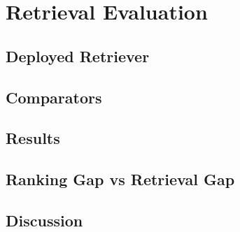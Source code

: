 \section{Retrieval Evaluation}
\label{sec:retrieval-results}


\subsection{Deployed Retriever}

\subsection{Comparators}

\subsection{Results}

\subsection{Ranking Gap vs Retrieval Gap}

\subsection{Discussion}
